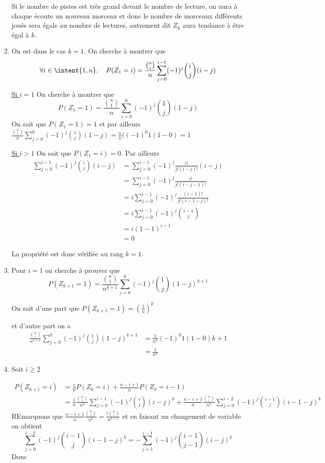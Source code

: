 \begin{correction}
\begin{enumerate}
Si le nombre de pistes est très grand devant le nombre de lecture, on aura à chaque écoute un nouveau morceau et donc le nombre de morceaux différents joués sera égale au nombre de lectures, autrement dit $Z_k $ aura tendance à être égal à $k$.


\item On est dans le cas $k=1$. On cherche à montrer que 
$$\forall i\in \intent{ 1, n}, \quad P(Z_1 =i) =\frac{\binom{n}{i}}{n} \sum_{j=0}^{i-1} (-1)^j \binom{i}{j}(i-j)$$


\underline{ Si $i =1$}
On cherche à montrer que 
$$P(Z_1 =1) =\frac{\binom{n}{1}}{n} \sum_{j=0}^{0} (-1)^j \binom{1}{j}(1-j)$$
On sait que $P(Z_1= 1) =1$  et par ailleurs 
$\frac{\binom{n}{1}}{n} \sum_{j=0}^{0} (-1)^j \binom{1}{j}(1-j) =  \frac{n}{n}((-1)^0 1 (1-0) = 1$

\underline{ Si $i >1$}
On sait que $P(Z_1= i) =0$. Par ailleurs 
\begin{align*}
\sum_{j=0}^{i-1} (-1)^j \binom{i}{j}(i-j) &=  \sum_{j=0}^{i-1} (-1)^j \frac{i!}{j! (i-j)!}
(i-j) \\
&=  \sum_{j=0}^{i-1} (-1)^j \frac{i!}{j! (i-j-1)!}\\
&=  i\sum_{j=0}^{i-1} (-1)^j \frac{(i-1)!}{j! (i-1-j)!}\\
&=  i\sum_{j=0}^{i-1} (-1)^j \binom{i-1}{j}\\
&=  i(1-1)^{i-1}\\
&=0
\end{align*}

La propriété est donc vérifiée au rang $k=1$. 



\item Pour $i=1$ on cherche à prouver que 
$$P(Z_{k+1} =1) =\frac{\binom{n}{1}}{n^{k+1}} \sum_{j=0}^{0} (-1)^j \binom{1}{j}(1-j)^{k+1}$$

On sait d'une part que $P(Z_{k+1} =1) = (\frac{1}{n} )^{k}$

et d'autre part on  a 
\begin{align*}
\frac{\binom{n}{1}}{n^{k+1}} \sum_{j=0}^{0} (-1)^j \binom{1}{j}(1-j)^{k+1} &= \frac{1}{n^k} (-1) ^0 1 (1-0){k+1}\\
&= \frac{1}{n^k}
\end{align*}



\item Soit $i\geq 2$ 

\begin{align*}
P(Z_{k+1} = i) &=  \frac{i}{n} P(Z_k =i ) + \frac{n-i+1}{n} P(Z_k =i-1)	\\
					&= \frac{i}{n}   \frac{\binom{n}{i}}{n^k} \sum_{j=0}^{i-1} (-1)^j \binom{i}{j}(i-j)^k +  \frac{n-i+1}{n}  \frac{\binom{n}{i}}{n^k} \sum_{j=0}^{i-2} (-1)^j \binom{i-1}{j}(i-1-j)^k
\end{align*}
REmarquons que 
$\frac{n-i+1}{n}  \frac{\binom{n}{i}}{n^k}  =  \frac{i\binom{n}{i}}{n^{k+1}}$
et en faisant un changement de variable on obtient 
$$\sum_{j=0}^{i-2} (-1)^j \binom{i-1}{j}(i-1-j)^k = -\sum_{j=1}^{i-1} (-1)^j \binom{i-1}{j-1}(i-j)^k$$
Donc 


\end{enumerate}
\end{correction}
